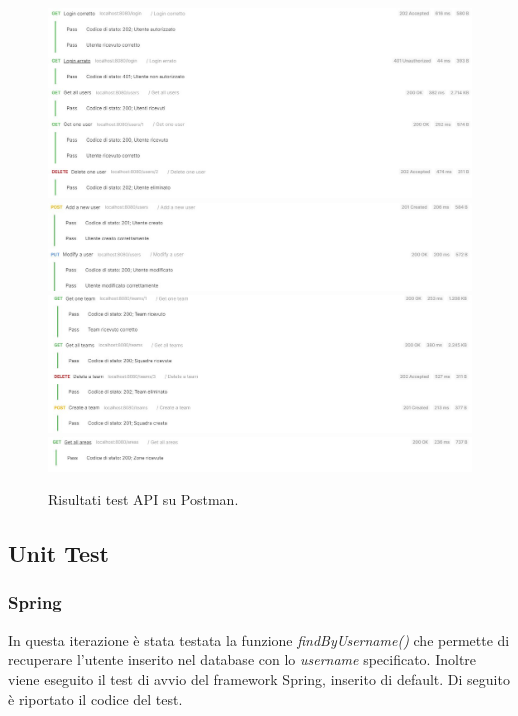 \begin{itemize}
	\begin{figure}[h!]
		\centering
		\includegraphics[width=0.99\linewidth]{./Iterazione 2/ImageFiles/TestUserController1}
		\includegraphics[width=0.99\linewidth]{./Iterazione 2/ImageFiles/TestUserController2}
		\includegraphics[width=1\linewidth]{./Iterazione 2/ImageFiles/TestTeamController}
		\includegraphics[width=1\linewidth]{./Iterazione 2/ImageFiles/TestAreaController}
		\caption{Risultati test API su Postman.}
		\label{fig:RisultatiTestAPIIT2}
	\end{figure}
\end{itemize}

\clearpage

\subsection{Unit Test}
\subsubsection{Spring}
In questa iterazione è stata testata la funzione \textit{findByUsername()} che permette di recuperare l'utente inserito nel database con lo \textit{username} specificato. Inoltre viene eseguito il test di avvio del framework Spring, inserito di default. Di seguito è riportato il codice del test.

